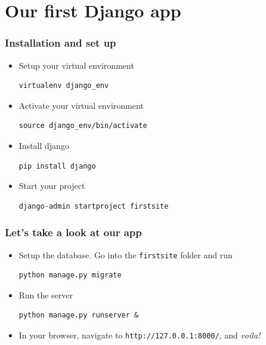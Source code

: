 \documentclass[10pt,t,xcolor=dvipsnames]{beamer}
\begin{document}
\section{Our first Django app}
\begin{frame}[fragile]
\frametitle{Installation and set up}
\begin{itemize}[<+->]
\item Setup your virtual environment
\begin{lstlisting}
virtualenv django_env
\end{lstlisting}
\item Activate your virtual environment
\begin{lstlisting}
source django_env/bin/activate
\end{lstlisting}
\item Install django
\begin{lstlisting}
pip install django
\end{lstlisting}
\item Start your project
\begin{lstlisting}
django-admin startproject firstsite
\end{lstlisting}
\end{itemize}
\end{frame}
\begin{frame}[fragile]
\frametitle{Let's take a look at our app}
\begin{itemize}[<+->]
\item Setup the database. Go into the \texttt{firstsite} folder and run
\begin{lstlisting}
python manage.py migrate
\end{lstlisting}
\item Run the server
\begin{lstlisting}
python manage.py runserver &
\end{lstlisting}
\item In your browser, navigate to \texttt{http://127.0.0.1:8000/}, and \textit{voila!}
\end{itemize}
\end{frame}
\end{document}
